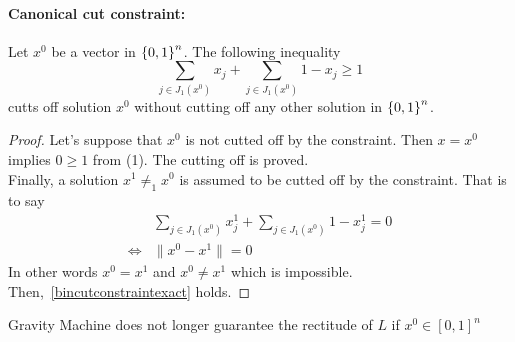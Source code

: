 \paragraph*{Canonical cut constraint:}
\begin{proposition}\label{bincutconstraintexact}
    Let $x^0$ be a vector in $\left\lbrace 0,1 \right\rbrace^n$. The following inequality
    \begin{equation}
        \sum_{j\in J_1(x^0)} x_j + \sum_{j \in J_1(x^0)} 1-x_ j \geq 1
    \end{equation}
    cutts off solution $x^0$ without cutting off any other solution in $\left\lbrace 0,1 \right\rbrace^n$.
\end{proposition}
\begin{proof}
Let's suppose that $x^0$ is not cutted off by the constraint. Then $x = x^0$ implies $0\geq 1$ from (1). The cutting off is proved.
\\Finally, a solution $x^1 \neq_1 x^0$ is assumed to be cutted off by the constraint. That is to say
\begin{align}
    & \sum_{j\in J_1(x^0)} x_j^1 + \sum_{j \in J_1(x^0)} 1-x_ j^1 = 0 \\
    \Longleftrightarrow &   \| x^0 - x^1 \| = 0
\end{align}
In other words $x^0 = x^1$ and $x^0 \neq x^1$ which is impossible. Then,~\ref{bincutconstraintexact} holds.
\end{proof}
\begin{proposition}
    Gravity Machine does not longer guarantee the rectitude of $L$ if $x^0\in \left\lbrack 0,1 \right\rbrack ^n$
\end{proposition}
